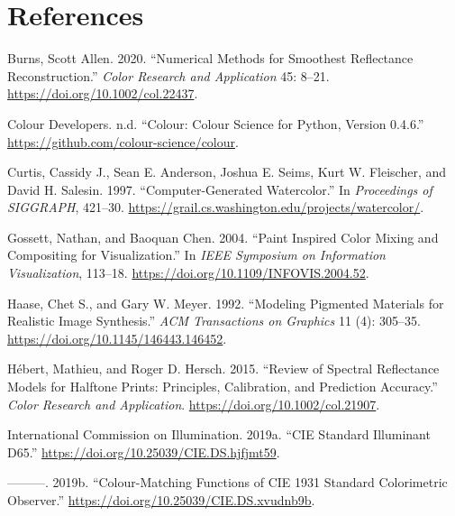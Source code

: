 \documentclass[
  10pt,
  twocolumn]{article}
\newlength{\cslhangindent}
\newlength{\cslentryspacingunit} %
\newenvironment{CSLReferences}[2] %
 {%
  \setlength{\parindent}{0pt}
  \ifodd #1
  \let\oldpar\par
  \def\par{\hangindent=\cslhangindent\oldpar}
  \fi
  \setlength{\parskip}{#2\cslentryspacingunit}
 }%
 {}
\begin{document}
\hypertarget{references}{%
\section*{References}\label{references}}

\hypertarget{refs}{}
\begin{CSLReferences}{1}{0}
\leavevmode{}%
Burns, Scott Allen. 2020. {``Numerical Methods for Smoothest Reflectance
Reconstruction.''} \emph{Color Research and Application} 45: 8--21.
\url{https://doi.org/10.1002/col.22437}.

\leavevmode{}%
Colour Developers. n.d. {``Colour: Colour Science for Python, Version
0.4.6.''} \url{https://github.com/colour-science/colour}.

\leavevmode{}%
Curtis, Cassidy J., Sean E. Anderson, Joshua E. Seims, Kurt W.
Fleischer, and David H. Salesin. 1997. {``Computer-Generated
Watercolor.''} In \emph{Proceedings of SIGGRAPH}, 421--30.
\url{https://grail.cs.washington.edu/projects/watercolor/}.

\leavevmode{}%
Gossett, Nathan, and Baoquan Chen. 2004. {``Paint Inspired Color Mixing
and Compositing for Visualization.''} In \emph{IEEE Symposium on
Information Visualization}, 113--18.
\url{https://doi.org/10.1109/INFOVIS.2004.52}.

\leavevmode{}%
Haase, Chet S., and Gary W. Meyer. 1992. {``Modeling Pigmented Materials
for Realistic Image Synthesis.''} \emph{ACM Transactions on Graphics} 11
(4): 305--35. \url{https://doi.org/10.1145/146443.146452}.

\leavevmode{}%
Hébert, Mathieu, and Roger D. Hersch. 2015. {``Review of Spectral
Reflectance Models for Halftone Prints: Principles, Calibration, and
Prediction Accuracy.''} \emph{Color Research and Application}.
\url{https://doi.org/10.1002/col.21907}.

\leavevmode{}%
International Commission on Illumination. 2019a. {``{CIE} Standard
Illuminant {D65}.''} \url{https://doi.org/10.25039/CIE.DS.hjfjmt59}.

\leavevmode{}%
---------. 2019b. {``Colour-Matching Functions of {CIE} 1931 Standard
Colorimetric Observer.''}
\url{https://doi.org/10.25039/CIE.DS.xvudnb9b}.


\end{CSLReferences}
\end{document}
